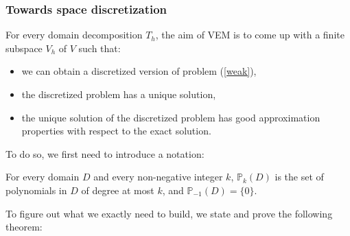 \subsubsection{Towards space discretization}
For every domain decomposition $T_h$, the aim of VEM is to come up with a finite subspace $V_h$ of $V$ such that:
\begin{itemize}
\item we can obtain a discretized version of problem (\ref{weak}),
\item the discretized problem has a unique solution,
\item the unique solution of the discretized problem has good approximation properties with respect to the exact solution. 
\end{itemize}

\noindent To do so, we first need to introduce a notation:
\begin{notation}
For every domain $D$ and every non-negative integer $k$, $\mathbb{P}_k(D)$ is the set of polynomials in $D$ of degree at most $k$, and $\mathbb{P}_{-1}(D)=\{0\}$.
\end{notation}

\noindent To figure out what we exactly need to build, we state and prove the following theorem: 

